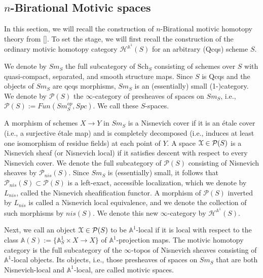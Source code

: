 \subsection{\texorpdfstring{$n$}{}-Birational Motivic spaces}
In this section, we will recall the construction of $n$-Birational motivic homotopy theory from [\cite{bachmann2019voevodsky}]. To set the stage, we will first recall the construction of the ordinary motivic homotopy category $\mathcal{H}^{\mathbb{A}^1}(S)$ for an arbitrary (Qcqs) scheme $S$. 

We denote by $Sm_S$ the full subcategory of $\mathrm{Sch}_S$ consisting of schemes over $S$ with quasi-compact, separated, and smooth structure maps. Since $S$ is Qcqs and the objects of $Sm_S$ are qcqs morphisms, $Sm_S$ is an (essentially) small (1-)category. We denote by $\mathcal{P}(S)$ the $\infty$-category of presheaves of spaces on $Sm_S$, i.e., $\mathcal{P}(S):=Fun(Sm_S^{op}, Spc)$. We call these $S$-spaces.

A morphism of schemes $X\to Y$ in $Sm_S$ is a Nisnevich cover if it is an \'etale cover (i.e., a surjective \'etale map) and is completely decomposed (i.e., induces at least one isomorphism of residue fields) at each point of $Y$. A space $\EuScript{X}\in \mathcal{P}(S)$ is a Nisnevich sheaf (or Nisnevich local) if it satisfies descent with respect to every Nisnevich cover. We denote the full subcategory of $\mathcal{P}(S)$ consisting of Nisnevich sheaves by $\mathcal{P}_{nis}(S)$. Since $Sm_S$ is (essentially) small, it follows that $\mathcal{P}_{nis}(S)\subset \mathcal{P}(S)$ is a left-exact, accessible localization, which we denote by $L_{nis}$, called the Nisnevich sheafification functor. A morphism of $\mathcal{P}(S)$ inverted by $L_{nis}$ is called a Nisnevich local equivalence, and we denote the collection of such morphisms by $nis(S)$. We denote this new $\infty$-category by $\mathcal{H}^{\mathbb{A}^1}(S)$.

Next, we call an object $\EuScript{X}\in \mathcal{P}(S)$ to be $\mathbb{A}^1$-local if it is local with respect to the class $\mathbb{A}(S):=\{\mathbb{A}^1_S\times X\to X\}$ of $\mathbb{A}^1$-projection maps. The motivic homotopy category is the full subcategory of the $\infty$-topos of Nisnevich sheaves consisting of $\mathbb{A}^1$-local objects. Its objects, i.e., those presheaves of spaces on $Sm_S$ that are both Nisnevich-local and $\mathbb{A}^1$-local, are called motivic spaces. 

